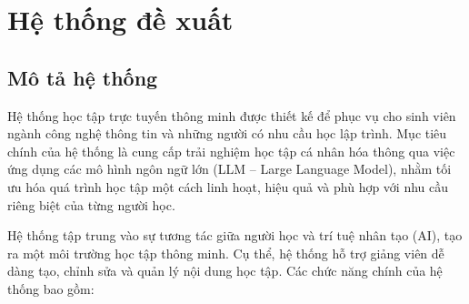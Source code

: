 \chapter{Hệ thống đề xuất}
\section{Mô tả hệ thống}

\par Hệ thống học tập trực tuyến thông minh được thiết kế để phục vụ cho sinh viên ngành công nghệ thông tin và những người có nhu cầu học lập trình. Mục tiêu chính của hệ thống là cung cấp trải nghiệm học tập cá nhân hóa thông qua việc ứng dụng các mô hình ngôn ngữ lớn (LLM – Large Language Model), nhằm tối ưu hóa quá trình học tập một cách linh hoạt, hiệu quả và phù hợp với nhu cầu riêng biệt của từng người học.

\par Hệ thống tập trung vào sự tương tác giữa người học và trí tuệ nhân tạo (AI), tạo ra một môi trường học tập thông minh. Cụ thể, hệ thống hỗ trợ giảng viên dễ dàng tạo, chỉnh sửa và quản lý nội dung học tập. Các chức năng chính của hệ thống bao gồm:

